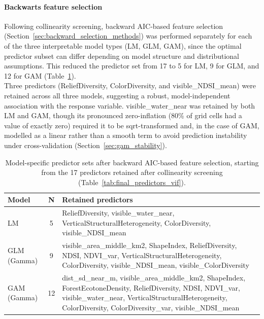 \documentclass[hidelinks, 11pt]{article}
\begin{document}
\paragraph{Backwarts feature selection}

Following collinearity screening, backward AIC-based feature selection (Section~\ref{sec:backward_selection_methods}) was performed separately for each of the three interpretable model types (LM, GLM, GAM), since the optimal predictor subset can differ depending on model structure and distributional assumptions. This reduced the predictor set from 17 to 5 for LM, 9 for GLM, and 12 for GAM (Table~\ref{tab:backward_selection_results}).
\\
Three predictors (ReliefDiversity, ColorDiversity, and visible\_NDSI\_mean) were retained across all three models, suggesting a robust, model-independent association with the response variable. visible\_water\_near was retained by both LM and GAM, though its pronounced zero-inflation (80\% of grid cells had a value of exactly zero) required it to be sqrt-transformed and, in the case of GAM, modelled as a linear rather than a smooth term to avoid prediction instability under cross-validation (Section~\ref{sec:gam_stability}).

\begin{table}[htbp]
\centering
\caption{Model-specific predictor sets after backward AIC-based feature selection, starting from the 17 predictors retained after collinearity screening (Table~\ref{tab:final_predictors_vif}).}
\label{tab:backward_selection_results}
\begin{tabular}{@{}lcp{9cm}@{}}
\toprule
\textbf{Model} & \textbf{N} & \textbf{Retained predictors} \\
\midrule
LM  & 5 & ReliefDiversity, visible\_water\_near, VerticalStructuralHeterogeneity, ColorDiversity, visible\_NDSI\_mean \\
\addlinespace
GLM (Gamma) & 9 & visible\_area\_middle\_km2, ShapeIndex, ReliefDiversity, NDSI, NDVI\_var, VerticalStructuralHeterogeneity, ColorDiversity, visible\_NDSI\_mean, visible\_ColorDiversity \\
\addlinespace
GAM (Gamma) & 12 & dist\_sd\_near\_m, visible\_area\_middle\_km2, ShapeIndex, ForestEcotoneDensity, ReliefDiversity, NDSI, NDVI\_var, visible\_water\_near, VerticalStructuralHeterogeneity, ColorDiversity, ColorDiversity\_var, visible\_NDSI\_mean \\
\bottomrule
\end{tabular}
\end{table}
\end{document}
